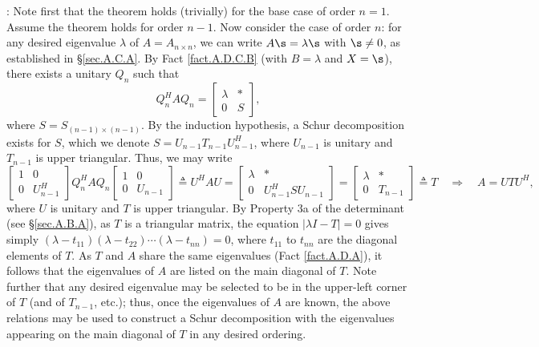 \/: Note first that the theorem holds
(trivially) for the base case of order $n=1$.  Assume the theorem
holds for order $n-1$.  Now consider the case of order $n$: for any
desired eigenvalue $\lambda$ of $A=A_{n\times n}$, we can write
$A\s=\lambda \s$ with $\s\ne 0$, as established in \S \ref{sec.A.C.A}.
By Fact \ref{fact.A.D.C.B} (with $B=\lambda$ and $X=\s$), there exists
a unitary $Q_{n}$ such that
\begin{equation*}
Q_{n}^{H} A Q_{n} =\begin{bmatrix} \lambda & * \\ 0 & S \end{bmatrix},
\end{equation*}
where $S=S_{(n-1)\times (n-1)}$.  By the induction hypothesis, a Schur
decomposition exists for $S$, which we denote $S=U_{n-1} T_{n-1}
U^{H}_{n-1}$, where $U_{n-1}$ is unitary and $T_{n-1}$ is upper
triangular.  Thus, we may write
\begin{equation*}
    \begin{bmatrix} 1 & 0 \\ 0 & U^{H}_{n-1} \end{bmatrix} Q_{n}^{H} A Q_{n}
		\begin{bmatrix} 1 & 0 \\ 0 & U_{n-1}     \end{bmatrix} \triangleq U^{H} A U =
		\begin{bmatrix} \lambda & * \\ 0 & U^{H}_{n-1} S U_{n-1} \end{bmatrix} =
		\begin{bmatrix} \lambda & * \\ 0 & T_{n-1} \end{bmatrix} \triangleq
		    T \quad \Rightarrow \quad A = U T U^{H},
\end{equation*}
where $U$ is unitary and $T$ is upper triangular.  By Property 3a of
the determinant (see \S \ref{sec.A.B.A}), as $T$ is a triangular
matrix, the equation $|\lambda I-T|=0$ gives simply
$(\lambda-t_{11})(\lambda-t_{22})\cdots(\lambda-t_{nn})=0$, where
$t_{11}$ to $t_{nn}$ are the diagonal elements of $T$.  As $T$ and $A$
share the same eigenvalues (Fact \ref{fact.A.D.A}), it follows that
the eigenvalues of $A$ are listed on the main diagonal of $T$.  Note
further that any desired eigenvalue may be selected to be in the
upper-left corner of $T$ (and of $T_{n-1}$, etc.); thus, once the
eigenvalues of $A$ are known, the above relations may be used to
construct a Schur decomposition with the eigenvalues appearing on the
main diagonal of $T$ in any desired ordering.   \endproof \vskip0.1in

